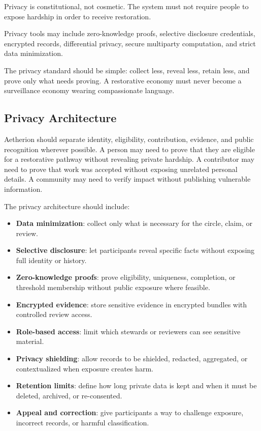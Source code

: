 \documentclass[12pt]{article}
\begin{document}
Privacy is constitutional, not cosmetic. The system must not require people to expose hardship in order to receive restoration.

Privacy tools may include zero-knowledge proofs, selective disclosure credentials, encrypted records, differential privacy, secure multiparty computation, and strict data minimization.

The privacy standard should be simple: collect less, reveal less, retain less, and prove only what needs proving. A restorative economy must never become a surveillance economy wearing compassionate language.

\subsection{Privacy Architecture}

Aetherion should separate identity, eligibility, contribution, evidence, and public recognition wherever possible. A person may need to prove that they are eligible for a restorative pathway without revealing private hardship. A contributor may need to prove that work was accepted without exposing unrelated personal details. A community may need to verify impact without publishing vulnerable information.

The privacy architecture should include:

\begin{itemize}
  \item \textbf{Data minimization}: collect only what is necessary for the circle, claim, or review.
  \item \textbf{Selective disclosure}: let participants reveal specific facts without exposing full identity or history.
  \item \textbf{Zero-knowledge proofs}: prove eligibility, uniqueness, completion, or threshold membership without public exposure where feasible.
  \item \textbf{Encrypted evidence}: store sensitive evidence in encrypted bundles with controlled review access.
  \item \textbf{Role-based access}: limit which stewards or reviewers can see sensitive material.
  \item \textbf{Privacy shielding}: allow records to be shielded, redacted, aggregated, or contextualized when exposure creates harm.
  \item \textbf{Retention limits}: define how long private data is kept and when it must be deleted, archived, or re-consented.
  \item \textbf{Appeal and correction}: give participants a way to challenge exposure, incorrect records, or harmful classification.
\end{itemize}
\end{document}
